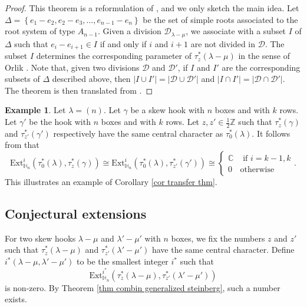 \documentclass[11pt]{amsart}
\numberwithin{equation}{section}
\theoremstyle{definition}
\newtheorem{example}[thm]{Example}
\begin{document}
\begin{proof}
This theorem is a reformulation of \cite[Theorem 1]{orlik2005extensions}, and we only sketch the main idea.  Let \(\Delta=\left\{e_1-e_2, e_2-e_3, \ldots, e_{n-1}-e_n\right\}\) be the set of simple roots associated to the root system of type \(A_{n-1}\). Given a division \(\mathcal D_{\lambda-\mu}\), we associate with a subset \(I\) of \(\Delta\) such that \(e_i-e_{i+1} \in I\) if and only if \(i\) and  \(i+1\) are not divided in \(\mathcal D\). The subset \(I\) determines the corresponding parameter of \(\tau^*_z(\lambda-\mu)\) in the sense of Orlik \cite{orlik2005extensions}. Note that, given two divisions \(\mathcal D\) and \(\mathcal D'\), if \(I\) and \(I'\) are the corresponding subsets of \(\Delta\) described above, then \(|I\cup I'|=|\mathcal D\cup \mathcal D'|\) and \(|I \cap I'|=|\mathcal D\cap \mathcal D'|\). The theorem is then translated from \cite[Theorem 1]{orlik2005extensions}.
\end{proof}



\begin{example} \label{ex one hook case}
Let $\lambda=(n)$. Let $\gamma$ be a skew hook with $n$ boxes and with $k$ rows. Let $\gamma'$ be the hook with $n$ boxes and with $k$ rows. Let $z, z' \in \frac{1}{2}\mathbb Z$ such that $\tau^*_z(\gamma)$ and $\tau^*_{z'}(\gamma')$ respectively have the same central character as $\tau_0^*(\lambda)$. It follows from \cite{orlik2005extensions} that
\[  \mathrm{Ext}^i_{\mathbb H_n}(\tau^*_0(\lambda), \tau^*_z(\gamma)) \cong \mathrm{Ext}^i_{\mathbb H_n}(\tau^*_0(\lambda), \tau^*_{z'}(\gamma')) \cong \begin{cases} \mathbb C & \mbox{ if $i=k-1, k$} \\ 0 & \mbox{otherwise} \end{cases} .
 \]
 This illustrates an example of Corollary \ref{cor transfer thm}.
\end{example}



\subsection{Conjectural extensions}

For two skew hooks $\lambda-\mu$ and $\lambda'-\mu'$ with \(n\) boxes, we fix the numbers $z$ and $z'$ such that $\tau^*_z(\lambda-\mu)$ and $\tau^*_{z'}(\lambda'-\mu')$ have the same central character. Define $i^*(\lambda-\mu, \lambda'-\mu')$ 
to be the smallest integer $i^*$ such that
\[   \mathrm{Ext}^{i^*}_{\mathbb H_n}(\tau^*_z(\lambda-\mu), \tau^*_{z'}(\lambda'-\mu'))
\]
is non-zero. By Theorem \ref{thm combin generalized steinberg}, such a number exists.
\end{document}
